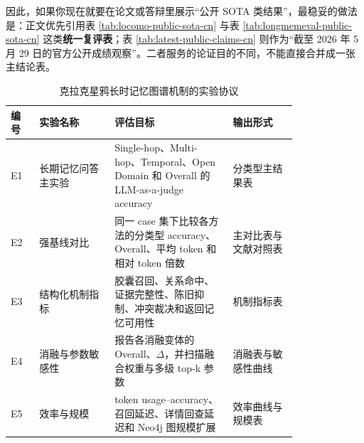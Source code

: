 \documentclass[a4paper,fleqn]{cas-sc}
\begin{document}
\begin{CJK*}{UTF8}{gbsn}
\begin{table}[t]
\centering
\caption{截至 2026 年 5 月 29 日可核验的官方最新公开自报成绩}
\label{tab:latest-public-claims-cn}
\scriptsize
{}
\end{table}

因此，如果你现在就要在论文或答辩里展示“公开 SOTA 类结果”，最稳妥的做法是：正文优先引用表 \ref{tab:locomo-public-sota-cn} 与表 \ref{tab:longmemeval-public-sota-cn} 这类\textbf{统一复评表}；表 \ref{tab:latest-public-claims-cn} 则作为“截至 2026 年 5 月 29 日的官方公开成绩观察”。二者服务的论证目的不同，不能直接合并成一张主结论表。

\begin{table}[t]
\centering
\small
\caption{克拉克星鸦长时记忆图谱机制的实验协议}
\label{tab:nutcracker-experiments}
\setlength{\tabcolsep}{3pt}
\begin{tabular}{P{0.08\linewidth}P{0.21\linewidth}P{0.33\linewidth}P{0.18\linewidth}}
\toprule
编号 & 实验名称 & 评估目标 & 输出形式 \\
\midrule
E1 & 长期记忆问答主实验 & Single-hop、Multi-hop、Temporal、Open Domain 和 Overall 的 LLM-as-a-judge accuracy & 分类型主结果表 \\
E2 & 强基线对比 & 同一 case 集下比较各方法的分类型 accuracy、Overall、平均 token 和相对 token 倍数 & 主对比表与文献对照表 \\
E3 & 结构化机制指标 & 胶囊召回、关系命中、证据完整性、陈旧抑制、冲突裁决和返回记忆可用性 & 机制指标表 \\
E4 & 消融与参数敏感性 & 报告各消融变体的 Overall、$\Delta$，并扫描融合权重与多级 top-k 参数 & 消融表与敏感性曲线 \\
E5 & 效率与规模 & token usage--accuracy、召回延迟、详情回查延迟和 Neo4j 图规模扩展 & 效率曲线与规模表 \\
\bottomrule
\end{tabular}
\end{table}


\end{CJK*}
\end{document}

